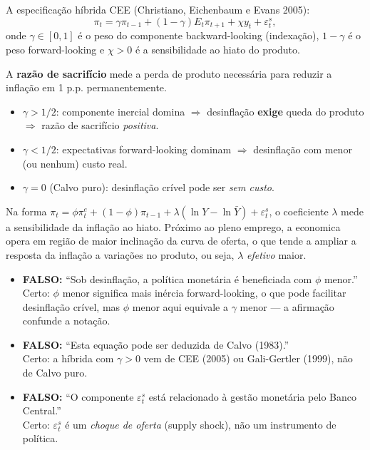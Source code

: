 \documentclass[12pt, a4paper]{article}
\begin{document}
A especificação híbrida CEE (Christiano, Eichenbaum e Evans 2005):
\[
  \pi_t = \gamma \pi_{t-1} + (1-\gamma) E_t\pi_{t+1} + \chi y_t + \varepsilon_t^s,
\]
onde $\gamma \in [0,1]$ é o peso do componente backward-looking (indexação), $1-\gamma$ é o peso forward-looking e $\chi > 0$ é a sensibilidade ao hiato do produto.

\begin{fatorbox}[title={Condição para razão de sacrifício positiva}]
A \textbf{razão de sacrifício} mede a perda de produto necessária para reduzir a inflação em 1 p.p. permanentemente.
\begin{itemize}[leftmargin=*]
  \item $\gamma > 1/2$: componente inercial domina $\Rightarrow$ desinflação \textbf{exige} queda do produto $\Rightarrow$ razão de sacrifício \emph{positiva}.
  \item $\gamma < 1/2$: expectativas forward-looking dominam $\Rightarrow$ desinflação com menor (ou nenhum) custo real.
  \item $\gamma = 0$ (Calvo puro): desinflação crível pode ser \emph{sem custo}.
\end{itemize}
\end{fatorbox}

\begin{fatorbox}[title={Papel de $\lambda$ na Curva de Phillips geral}]
Na forma $\pi_t = \phi\pi_t^e + (1-\phi)\pi_{t-1} + \lambda(\ln Y - \ln\bar Y) + \varepsilon_t^s$, o coeficiente $\lambda$ mede a sensibilidade da inflação ao hiato. Próximo ao pleno emprego, a economica opera em região de maior inclinação da curva de oferta, o que tende a ampliar a resposta da inflação a variações no produto, ou seja, $\lambda$ \emph{efetivo} maior.
\end{fatorbox}

\begin{armbox}[title={Armadilhas (Q9)}]
\begin{itemize}[leftmargin=*]
  \item \textbf{FALSO:} ``Sob desinflação, a política monetária é beneficiada com $\phi$ menor.'' \\ Certo: $\phi$ menor significa mais inércia forward-looking, o que pode facilitar desinflação crível, mas $\phi$ menor aqui equivale a $\gamma$ menor — a afirmação confunde a notação.
  \item \textbf{FALSO:} ``Esta equação pode ser deduzida de Calvo (1983).'' \\ Certo: a híbrida com $\gamma > 0$ vem de CEE (2005) ou Gali-Gertler (1999), não de Calvo puro.
  \item \textbf{FALSO:} ``O componente $\varepsilon_t^s$ está relacionado à gestão monetária pelo Banco Central.'' \\ Certo: $\varepsilon_t^s$ é um \emph{choque de oferta} (supply shock), não um instrumento de política.
\end{itemize}
\end{armbox}
\end{document}

